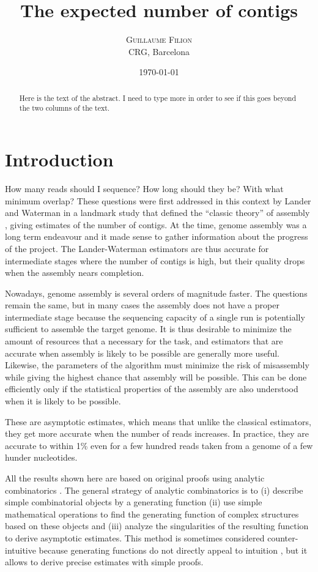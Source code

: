 \documentclass{article}
\title{The expected number of contigs}
\author{
\textsc{Guillaume Filion} \\ [1ex]
\normalsize CRG, Barcelona
}
\date{\today}
\begin{document}
\maketitle

\begin{abstract}
Here is the text of the abstract. I need to type more in order to see if
this goes beyond the two columns of the text.
\end{abstract}



\section{Introduction}

How many reads should I sequence? How long should they be? With what
minimum overlap? These questions were first addressed in this context by
Lander and Waterman in a landmark study that defined the ``classic
theory'' of assembly \cite{pmid3294162}, giving estimates of the number of
contigs. At the time, genome assembly was a long term endeavour and it
made sense to gather information about the progress of the project. The
Lander-Waterman estimators are thus accurate for intermediate stages where
the number of contigs is high, but their quality drops when the assembly
nears completion.

Nowadays, genome assembly is several orders of magnitude faster. The
questions remain the same, but in many cases the assembly does not have a
proper intermediate stage because the sequencing capacity of a single run
is potentially sufficient to assemble the target genome. It is thus
desirable to minimize the amount of resources that a necessary for the
task, and estimators that are accurate when assembly is likely to be
possible are generally more useful. Likewise, the parameters of the
algorithm must minimize the risk of misassembly while giving the highest
chance that assembly will be possible. This can be done efficiently only
if the statistical properties of the assembly are also understood when it
is likely to be possible.

These are asymptotic estimates, which means that unlike the classical
estimators, they get more accurate when the number of reads increases. In
practice, they are accurate to within 1\% even for a few hundred reads
taken from a genome of a few hunder nucleotides.

All the results shown here are based on original proofs using analytic
combinatorics \cite{AnalComb2009}. The general strategy of analytic
combinatorics is to (i) describe simple combinatorial objects by a
generating function (ii) use simple mathematical operations to find the
generating function of complex structures based on these objects and (iii)
analyze the singularities of the resulting function to derive asymptotic
estimates. This method is sometimes considered counter-intuitive because
generating functions do not directly appeal to intuition
\cite{AnalComb1996}, but it allows to derive precise estimates with simple
proofs.
\end{document}
